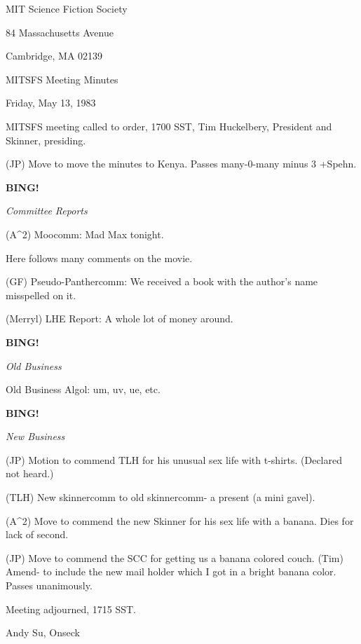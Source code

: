 \documentclass[12pt]{article}
\newcommand{\bing}{{\bf BING!} }
\newcommand{\goto}[1]{\bing \vskip 12pt \centerline{{\em{#1}}}}
\begin{document}
\begin{center}

MIT Science Fiction Society 

84 Massachusetts Avenue

Cambridge, MA 02139

\vspace{12pt}

MITSFS Meeting Minutes 

Friday, May 13, 1983

\end{center}
 
\vspace{18pt}

\setlength{\parskip}{6pt}

\noindent
MITSFS meeting called to order, 1700 SST,
Tim Huckelbery, President and Skinner, presiding.

(JP) Move to move the minutes to Kenya. Passes many-0-many minus 3 +Spehn.

\goto{Committee Reports}

(A^2) Moocomm: Mad Max tonight.

Here follows many comments on the movie.

(GF) Pseudo-Panthercomm: We received a book with the author's name misspelled on it.

(Merryl) LHE Report: A whole lot of money around.

\goto{Old Business}

Old Business Algol: um, uv, ue, etc.

\goto{New Business}

(JP) Motion to commend TLH for his unusual sex life with t-shirts. (Declared not heard.)

(TLH) New skinnercomm to old skinnercomm- a present (a mini gavel).

(A^2) Move to commend the new Skinner for his sex life with a banana. Dies for lack of second.

(JP) Move to commend the SCC for getting us a banana colored couch. (Tim) Amend- to include the new mail holder which I got in a bright banana color. Passes unanimously.

\vspace{12pt}

\noindent
Meeting adjourned, 1715 SST.

\vspace{18pt}

\centerline{Andy Su, Onseck}
\end{document}
